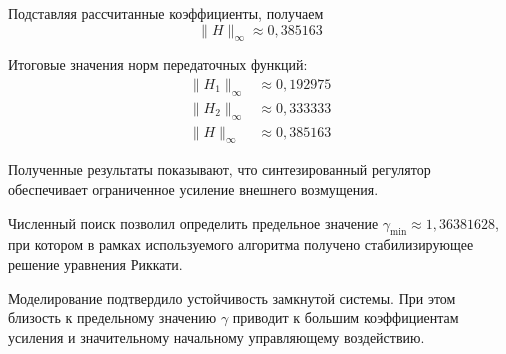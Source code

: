 Подставляя рассчитанные коэффициенты,
получаем
\[
\|H\|_\infty\approx0{,}385163
\]

Итоговые значения норм передаточных функций:
\[
\begin{aligned}
\|H_1\|_\infty&\approx0{,}192975\\
\|H_2\|_\infty&\approx0{,}333333\\
\|H\|_\infty&\approx0{,}385163
\end{aligned}
\]

Полученные результаты показывают, что
синтезированный регулятор обеспечивает
ограниченное усиление внешнего возмущения.

Численный поиск позволил определить предельное
значение $\gamma_{\min}\approx1{,}36381628$,
при котором в рамках используемого алгоритма
получено стабилизирующее решение уравнения Риккати.

Моделирование подтвердило устойчивость замкнутой
системы. При этом близость к предельному значению
$\gamma$ приводит к большим коэффициентам
усиления и значительному начальному управляющему
воздействию.
